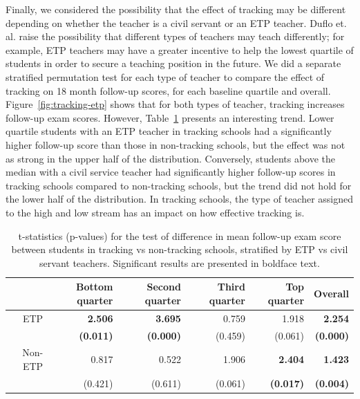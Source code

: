 \documentclass[11pt]{article}
\begin{document}
Finally, we considered the possibility that the effect of tracking may be different depending on whether the teacher is a civil servant or an ETP teacher. Duflo et. al. raise the possibility that different types of teachers may teach differently; for example, ETP teachers may have a greater incentive to help the lowest quartile of students in order to secure a teaching position in the future. We did a separate stratified permutation test for each type of teacher to compare the effect of tracking on 18 month follow-up scores, for each baseline quartile and overall.  Figure~\ref{fig:tracking-etp} shows that for both types of teacher, tracking increases follow-up exam scores.  However, Table~\ref{tab:tracking-etp} presents an interesting trend.  Lower quartile students with an ETP teacher in tracking schools had a significantly higher follow-up score than those in non-tracking schools, but the effect was not as strong in the upper half of the distribution.  Conversely, students above the median with a civil service teacher had significantly higher follow-up scores in tracking schools compared to non-tracking schools, but the trend did not hold for the lower half of the distribution.  In tracking schools, the type of teacher assigned to the high and low stream has an impact on how effective tracking is.


\begin{table}[ht]
\centering
\begin{tabular}{rrrrrr}
  \hline
 & Bottom quarter & Second quarter & Third quarter & Top quarter & Overall \\ 
  \hline
  ETP & {\bf 2.506} & {\bf 3.695} & 0.759 & 1.918 & {\bf 2.254 }\\ \vspace{2mm}
   & {\bf(0.011)} & {\bf (0.000) }& (0.459) & (0.061) & {\bf (0.000) }\\ 
  Non-ETP & 0.817 & 0.522 & 1.906 & {\bf 2.404 }& {\bf 1.423} \\ 
   & (0.421) & (0.611) & (0.061) & {\bf (0.017)} & {\bf (0.004)} \\ 
   \hline
\end{tabular}
\caption{t-statistics (p-values) for the test of difference in mean follow-up exam score between students in tracking vs non-tracking schools, stratified by ETP vs civil servant teachers. Significant results are presented in boldface text.}  \label{tab:tracking-etp}
\end{table} %
\end{document}
